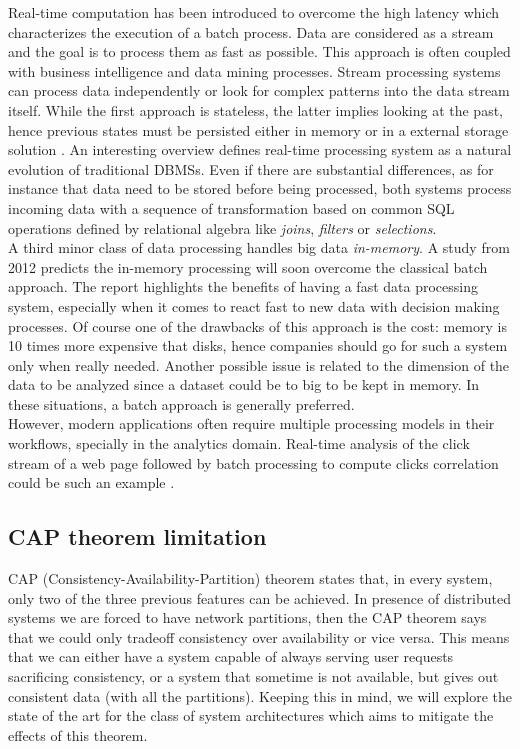 Real-time computation has been introduced to overcome the high latency which characterizes the execution of a batch process. Data are considered as a stream and the goal is to process them as fast as possible. This approach is often coupled with business intelligence and data mining processes. Stream processing systems can process data independently or look for complex patterns into the data stream itself. While the first approach is stateless, the latter implies looking at the past, hence previous states must be persisted either in memory or in a external storage solution \cite{bib49}. An interesting overview \cite{bib26} defines real-time processing system as a natural evolution of traditional DBMSs. Even if there are substantial differences, as for instance that data need to be stored before being processed, both systems process incoming data with a sequence of transformation based on common SQL operations defined by relational algebra like \textit{joins}, \textit{filters} or \textit{selections}.\\
A third minor class of data processing handles big data \textit{in-memory}.  A study from 2012 \cite{bib18} predicts the in-memory processing will soon overcome the classical batch approach. The report highlights the benefits of having a fast data processing system, especially when it comes to react fast to new data with decision making processes. Of course one of the drawbacks of this approach is the cost: memory is 10 times more expensive that disks, hence companies should go for such a system only when really needed. Another possible issue is related to the dimension of the data to be analyzed since a dataset could be to big to be kept in memory. In these situations, a batch approach is generally preferred.\\
However, modern applications often require multiple processing models in their workflows, specially in the analytics domain. Real-time analysis of the click stream of a web page followed by batch processing to compute clicks correlation could be such an example \cite{bib49}.

\subsection{CAP theorem limitation}
CAP (Consistency-Availability-Partition) theorem states that, in every system, only two of the three previous features can be achieved. In presence of distributed systems we are forced to have network partitions, then the CAP theorem says that we could only tradeoff consistency over availability or vice versa. This means that we can either have a system capable of always serving user requests sacrificing consistency, or a system that sometime is not available, but gives out consistent data (with all the partitions). Keeping this in mind, we will explore the state of the art for the class of system architectures which aims to mitigate the effects of this theorem.
